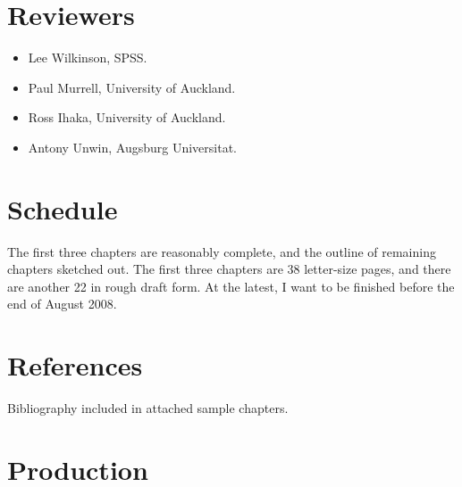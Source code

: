 \documentclass[oneside,letterpaper]{scrartcl}
\begin{document}
\section{Reviewers}\label{sec:reviewers}


\begin{itemize}

  \item Lee Wilkinson, SPSS.

  \item Paul Murrell, University of Auckland.

  \item Ross Ihaka, University of Auckland.

  \item Antony Unwin, Augsburg Universitat.

\end{itemize}

\section{Schedule}\label{sec:schedule}


The first three chapters are reasonably complete, and the outline of remaining chapters sketched out.  The first three chapters are 38 letter-size pages, and there are another 22 in rough draft form.  At the latest, I want to be finished before the end of August 2008.

\section{References}\label{sec:references} 


Bibliography included in attached sample chapters.

\section{Production}\label{sec:production}
\end{document}
